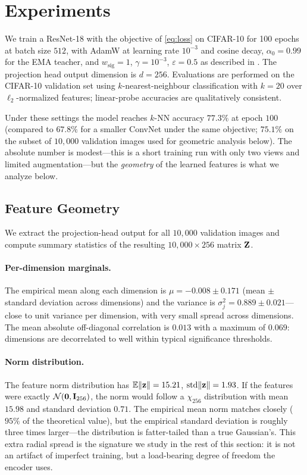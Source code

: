 \section{Experiments}
\label{sec:experiments}

We train a ResNet-18 with the objective of \eqref{eq:loss} on CIFAR-10 for 100 epochs at batch size $512$, with AdamW \citep{loshchilov2017adamw} at learning rate $10^{-3}$ and cosine decay, $\alpha_0 = 0.99$ for the EMA teacher, and $w_\text{sig} = 1$, $\gamma = 10^{-3}$, $\varepsilon = 0.5$ as described in . The projection head output dimension is $d = 256$. Evaluations are performed on the CIFAR-10 validation set using $k$-nearest-neighbour classification with $k = 20$ over $\ell_2$-normalized features; linear-probe accuracies are qualitatively consistent.

Under these settings the model reaches $k$-NN accuracy $77.3\%$ at epoch $100$ (compared to $67.8\%$ for a smaller ConvNet under the same objective; $75.1\%$ on the subset of $10{,}000$ validation images used for geometric analysis below). The absolute number is modest---this is a short training run with only two views and limited augmentation---but the \emph{geometry} of the learned features is what we analyze below.

\subsection{Feature Geometry}
\label{sec:geometry}

We extract the projection-head output for all $10{,}000$ validation images and compute summary statistics of the resulting $10{,}000 \times 256$ matrix $\mathbf{Z}$.

\paragraph{Per-dimension marginals.} The empirical mean along each dimension is $\mu = -0.008 \pm 0.171$ (mean $\pm$ standard deviation across dimensions) and the variance is $\sigma_j^2 = 0.889 \pm 0.021$---close to unit variance per dimension, with very small spread across dimensions. The mean absolute off-diagonal correlation is $0.013$ with a maximum of $0.069$: dimensions are decorrelated to well within typical significance thresholds.

\paragraph{Norm distribution.} The feature norm distribution has $\mathbb{E}\|\mathbf{z}\| = 15.21$, $\text{std}\|\mathbf{z}\| = 1.93$. If the features were exactly $\mathcal{N}(\mathbf{0}, \mathbf{I}_{256})$, the norm would follow a $\chi_{256}$ distribution with mean $15.98$ and standard deviation $0.71$. The empirical mean norm matches closely ($95\%$ of the theoretical value), but the empirical standard deviation is roughly three times larger---the distribution is fatter-tailed than a true Gaussian's. This extra radial spread is the signature we study in the rest of this section: it is not an artifact of imperfect training, but a load-bearing degree of freedom the encoder uses.


